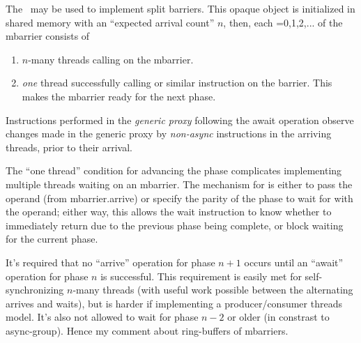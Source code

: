 \filbreak
{}

 The \mbarrier\ may be used to implement split barriers. This opaque object is initialized in shared memory with an ``expected arrival count'' $n$, then, each =0,1,2,... of the mbarrier consists of

\begin{enumerate}
  \item $n$-many threads calling  on the mbarrier.
  \item \textit{one} thread successfully calling  or similar instruction on the barrier. This makes the mbarrier ready for the next phase.
\end{enumerate}

\filbreak
Instructions performed in the \textit{generic proxy} following the await operation observe changes made in the generic proxy by \textit{non-async} instructions in the arriving threads, prior to their arrival.

\filbreak
The ``one thread'' condition for advancing the phase complicates implementing multiple threads waiting on an mbarrier. The mechanism for  is either to pass the  operand (from mbarrier.arrive) or specify the parity of the phase to wait for with the  operand; either way, this allows the wait instruction to know whether to immediately return due to the previous phase being complete, or block waiting for the current phase.

\filbreak
It's required that no ``arrive'' operation for phase $n+1$ occurs until an ``await'' operation for phase $n$ is successful.
This requirement is easily met for self-synchronizing $n$-many threads (with useful work possible between the alternating arrives and waits), but is harder if implementing a producer/consumer threads model.
It's also not allowed to wait for phase $n-2$ or older (in constrast to async-group).
Hence my comment about ring-buffers of mbarriers.

